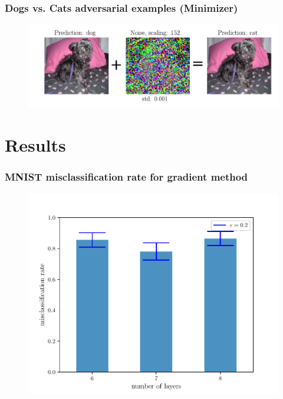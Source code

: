 \documentclass[handout]{beamer}
\begin{document}
\begin{frame}
\frametitle{Dogs vs. Cats adversarial examples (Minimizer)} 
\begin{figure}
\includegraphics[width=\linewidth]{../figures/adv_example_minimizer_dogs_vs_cats.pdf}
\end{figure}
\end{frame}

\section{Results}

\begin{frame}
\frametitle{MNIST misclassification rate for gradient method} 
\begin{figure}
\includegraphics[width=0.9\linewidth]{../figures/mnist_grad_misclassificationrate.pdf}
\end{figure}
\end{frame}
\end{document}
